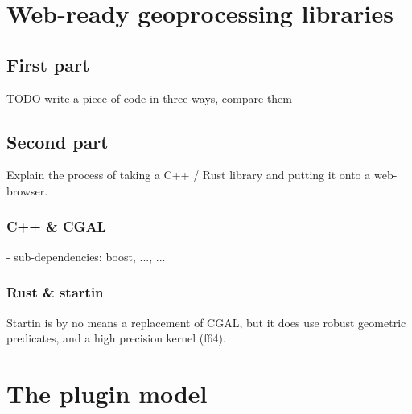\newpage

\section{Web-ready geoprocessing libraries}
\label{sec:implementation:compilation}

\subsection{First part}

\begin{note}
TODO write a piece of code in three ways, compare them
\end{note} 

\subsection{Second part}

\begin{note}
Explain the process of taking a C++ / Rust library and putting it onto a web-browser.
\end{note}


\subsubsection*{C++ \& CGAL}

\begin{note}
- sub-dependencies: boost, ..., ...
\end{note}
  
\subsubsection*{Rust \& startin}

\begin{note}
Startin is by no means a replacement of CGAL, 
but it does use robust geometric predicates, and a high precision kernel (f64).
\end{note}


\newpage

\section{The plugin model}
\label{sec:implementation:loading}

